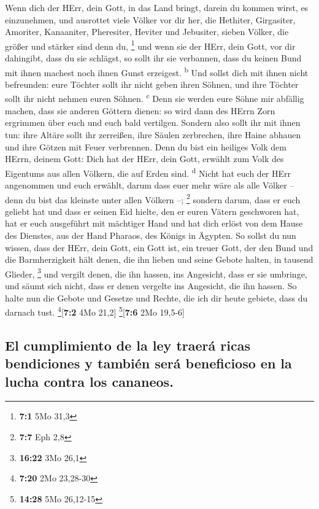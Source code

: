  Wenn dich der HErr, dein Gott, in das Land bringt, darein
du kommen wirst, es einzunehmen, und ausrottet viele Völker vor dir her,
die Hethiter, Girgasiter, Amoriter, Kanaaniter, Pheresiter, Heviter und
Jebusiter, sieben Völker, die größer und stärker sind denn du,
\footnote{\textbf{7:1} 5Mo 31,3}  und wenn sie der HErr,
dein Gott, vor dir dahingibt, dass du sie schlägst, so sollt ihr sie
verbannen, dass du keinen Bund mit ihnen machest noch ihnen Gunst
erzeigest. \textsuperscript{b}  Und sollst dich mit ihnen
nicht befreunden: eure Töchter sollt ihr nicht geben ihren Söhnen, und
ihre Töchter sollt ihr nicht nehmen euren Söhnen. \textsuperscript{c}
 Denn sie werden eure Söhne mir abfällig machen, dass sie
anderen Göttern dienen: so wird dann des HErrn Zorn ergrimmen über euch
und euch bald vertilgen.  Sondern also sollt ihr mit ihnen
tun: ihre Altäre sollt ihr zerreißen, ihre Säulen zerbrechen, ihre Haine
abhauen und ihre Götzen mit Feuer verbrennen.  Denn du
bist ein heiliges Volk dem HErrn, deinem Gott: Dich hat der HErr, dein
Gott, erwählt zum Volk des Eigentums aus allen Völkern, die auf Erden
sind. \textsuperscript{d}  Nicht hat euch der HErr
angenommen und euch erwählt, darum dass euer mehr wäre als alle Völker
-- denn du bist das kleinste unter allen Völkern --; \footnote{\textbf{7:7}
  Eph 2,8}  sondern darum, dass er euch geliebt hat und
dass er seinen Eid hielte, den er euren Vätern geschworen hat, hat er
euch ausgeführt mit mächtiger Hand und hat dich erlöst von dem Hause des
Dienstes, aus der Hand Pharaos, des Königs in Ägypten.  So
sollst du nun wissen, dass der HErr, dein Gott, ein Gott ist, ein treuer
Gott, der den Bund und die Barmherzigkeit hält denen, die ihn lieben und
seine Gebote halten, in tausend Glieder, \footnote{\textbf{16:22} 3Mo
  26,1}  und vergilt denen, die ihn hassen, ins
Angesicht, dass er sie umbringe, und säumt sich nicht, dass er denen
vergelte ins Angesicht, die ihn hassen.  So halte nun die
Gebote und Gesetze und Rechte, die ich dir heute gebiete, dass du
darnach tust. \footnote{\textbf{7:20} 2Mo 23,28-30}{[}\textbf{7:2} 4Mo
21,2{]} \footnote{\textbf{14:28} 5Mo 26,12-15}{[}\textbf{7:6} 2Mo
19,5-6{]}

\hypertarget{el-cumplimiento-de-la-ley-traeruxe1-ricas-bendiciones-y-tambiuxe9n-seruxe1-beneficioso-en-la-lucha-contra-los-cananeos.}{%
\subsection{El cumplimiento de la ley traerá ricas bendiciones y también
será beneficioso en la lucha contra los
cananeos.}\label{el-cumplimiento-de-la-ley-traeruxe1-ricas-bendiciones-y-tambiuxe9n-seruxe1-beneficioso-en-la-lucha-contra-los-cananeos.}}

